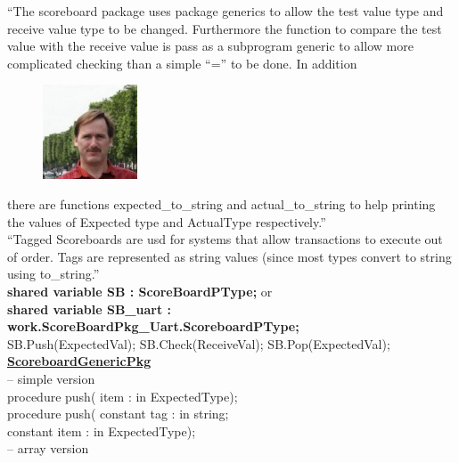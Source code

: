 \documentclass{article}
\begin{document}
\newpage
\noindent
``The scoreboard package uses package generics to allow the test value type and receive value type to 
be changed. Furthermore the function to compare the test value with the receive value is pass as a 
subprogram generic to allow more complicated checking than a simple ``='' to be done. In addition 

\begin{figure}
  \centering
  \includegraphics[width=0.25\textwidth]{jl}
\end{figure}
\noindent
there are functions expected\_to\_string and actual\_to\_string to help printing the values of Expected type 
and ActualType respectively.''\\
\noindent
``Tagged Scoreboards are usd for systems that allow transactions to execute out of order. Tags are represented 
as string values (since most types convert to string using to\_string.''\\

\noindent
\textbf{shared variable SB : ScoreBoardPType;} or\\
\textbf{shared variable SB\_uart : work.ScoreBoardPkg\_Uart.ScoreboardPType;}\\

\noindent
SB.Push(ExpectedVal); SB.Check(ReceiveVal); SB.Pop(ExpectedVal);\\

\noindent
\textbf{\underline{ScoreboardGenericPkg}}\\
-- simple version\\
procedure push( item : in ExpectedType);\\
procedure push( constant tag : in string;\\
                constant item : in ExpectedType);\\
-- array version
\end{document}
